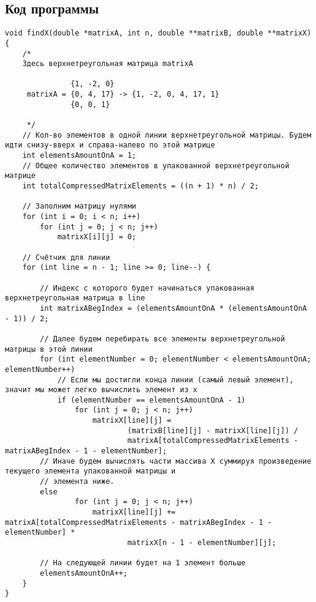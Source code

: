 \documentclass[a4paper, 12pt, oneside]{article}
\begin{document}
    \subsection{Код программы}
    \begin{verbatim}
void findX(double *matrixA, int n, double **matrixB, double **matrixX) {
    /*
    Здесь верхнетреугольная матрица matrixA

               {1, -2, 0}
     matrixA = {0, 4, 17} -> {1, -2, 0, 4, 17, 1}
               {0, 0, 1}

     */
    // Кол-во элементов в одной линии верхнетреугольной матрицы. Будем идти снизу-вверх и справа-налево по этой матрице
    int elementsAmountOnA = 1;
    // Общее количество элементов в упакованной верхнетреугольной матрице
    int totalCompressedMatrixElements = ((n + 1) * n) / 2;

    // Заполним матрицу нулями
    for (int i = 0; i < n; i++)
        for (int j = 0; j < n; j++)
            matrixX[i][j] = 0;

    // Счётчик для линии
    for (int line = n - 1; line >= 0; line--) {

        // Индекс с которого будет начинаться упакованная верхнетреугольная матрица в line
        int matrixABegIndex = (elementsAmountOnA * (elementsAmountOnA - 1)) / 2;

        // Далее будем перебирать все элементы верхнетреугольной матрицы в этой линии
        for (int elementNumber = 0; elementNumber < elementsAmountOnA; elementNumber++)
            // Если мы достигли конца линии (самый левый элемент), значит мы может легко вычислить элемент из x
            if (elementNumber == elementsAmountOnA - 1)
                for (int j = 0; j < n; j++)
                    matrixX[line][j] =
                            (matrixB[line][j] - matrixX[line][j]) /
                            matrixA[totalCompressedMatrixElements - matrixABegIndex - 1 - elementNumber];
        // Иначе будем вычислять части массива X суммируя произведение текущего элемента упакованной матрицы и
        // элемента ниже.
        else
                for (int j = 0; j < n; j++)
                    matrixX[line][j] += matrixA[totalCompressedMatrixElements - matrixABegIndex - 1 - elementNumber] *
                            matrixX[n - 1 - elementNumber][j];

        // На следующей линии будет на 1 элемент больше
        elementsAmountOnA++;
    }
}
    \end{verbatim}
\end{document}
